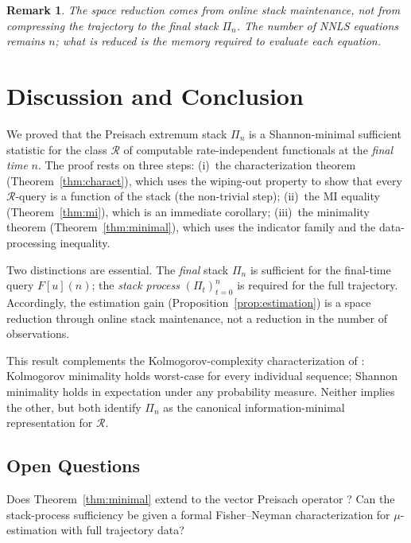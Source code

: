 \documentclass[lettersize,journal]{IEEEtran}
\newtheorem{remark}[theorem]{Remark}
\newcommand{\cR}{\mathcal{R}}
\newcommand{\stack}{\Pi}
\begin{document}
\begin{remark}
The space reduction comes from \emph{online stack maintenance},
not from compressing the trajectory to the final stack $\stack_n$.
The number of NNLS equations remains $n$; what is reduced is the
memory required to evaluate each equation.
\end{remark}

\section{Discussion and Conclusion}
\label{sec:conclusion}

We proved that the Preisach extremum stack $\stack_n$ is a
Shannon-minimal sufficient statistic for the class $\cR$ of
computable rate-independent functionals at the \emph{final time} $n$.
The proof rests on three steps:
(i)~the characterization theorem (Theorem~\ref{thm:charact}), which
uses the wiping-out property to show that every $\cR$-query is a
function of the stack (the non-trivial step);
(ii)~the MI equality (Theorem~\ref{thm:mi}), which is an immediate
corollary;
(iii)~the minimality theorem (Theorem~\ref{thm:minimal}), which uses
the indicator family and the data-processing inequality.

Two distinctions are essential.
The \emph{final} stack $\stack_n$ is sufficient for the final-time
query $F[u](n)$; the \emph{stack process} $(\stack_t)_{t=0}^n$ is
required for the full trajectory.
Accordingly, the estimation gain (Proposition~\ref{prop:estimation})
is a space reduction through online stack maintenance, not a
reduction in the number of observations.

This result complements the Kolmogorov-complexity characterization of
\cite{Frydrych2026IPL}: Kolmogorov minimality holds worst-case for
every individual sequence; Shannon minimality holds in expectation
under any probability measure.
Neither implies the other, but both identify $\stack_n$ as the
canonical information-minimal representation for $\cR$.

\subsection*{Open Questions}

Does Theorem~\ref{thm:minimal} extend to the vector Preisach
operator \cite{Brokate1996}?
Can the stack-process sufficiency be given a formal Fisher--Neyman
characterization for $\mu$-estimation with full trajectory data?
\end{document}

